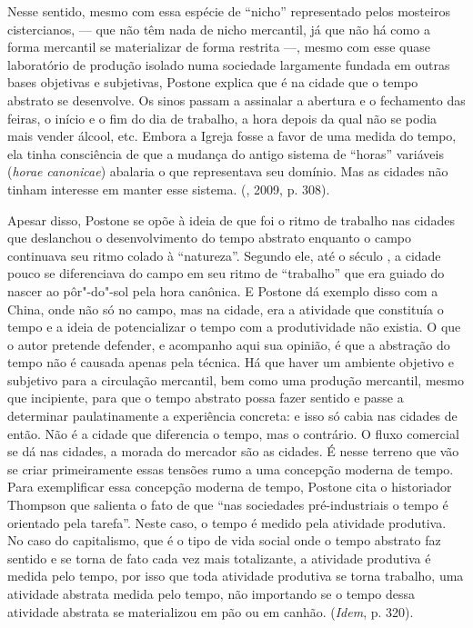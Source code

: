 Nesse sentido, mesmo com essa espécie de ``nicho'' representado pelos
mosteiros cistercianos, --- que não têm nada de nicho mercantil, já que não há
como a forma mercantil se materializar de forma restrita ---, mesmo com esse quase
laboratório de produção isolado numa sociedade largamente fundada em
outras bases objetivas e subjetivas, Postone explica que é na cidade que
o tempo abstrato se desenvolve. Os sinos passam a assinalar a abertura e
o fechamento das feiras, o início e o fim do dia de trabalho, a hora
depois da qual não se podia mais vender álcool, etc. Embora a Igreja
fosse a favor de uma medida do tempo, ela tinha consciência de que a
mudança do antigo sistema de ``horas'' variáveis (\emph{horae}
\emph{canonicae}) abalaria o que representava seu domínio. Mas as
cidades não tinham interesse em manter esse sistema. (, 2009, p.
308).

Apesar disso, Postone se opõe à ideia de que foi o ritmo de trabalho nas
cidades que deslanchou o desenvolvimento do tempo abstrato enquanto o
campo continuava seu ritmo colado à ``natureza''. Segundo ele, até o
século , a cidade pouco se diferenciava do campo em seu ritmo de
``trabalho'' que era guiado do nascer ao pôr"-do"-sol pela hora canônica.
E Postone dá exemplo disso com a China, onde não só no campo, mas na
cidade, era a atividade que constituía o tempo e a ideia de
potencializar o tempo com a produtividade não existia. O que o autor
pretende defender, e acompanho aqui sua opinião, é que a abstração do
tempo não é causada apenas pela técnica. Há que haver um ambiente
objetivo e subjetivo para a circulação mercantil, bem como uma produção
mercantil, mesmo que incipiente, para que o tempo abstrato possa fazer
sentido e passe a determinar paulatinamente a experiência concreta: e
isso só cabia nas cidades de então. Não é a cidade que diferencia o
tempo, mas o contrário. O fluxo comercial se dá nas cidades, a morada do
mercador são as cidades. É nesse terreno que vão se criar primeiramente
essas tensões rumo a uma concepção moderna de tempo. Para exemplificar
essa concepção moderna de tempo, Postone cita o historiador Thompson que
salienta o fato de que ``nas sociedades pré-industriais o tempo é
orientado pela tarefa''. Neste caso, o tempo é medido pela atividade
produtiva. No caso do capitalismo, que é o tipo de vida social onde o tempo
abstrato faz sentido e se torna de fato cada vez mais totalizante, a
atividade produtiva é medida pelo tempo, por isso que toda atividade
produtiva se torna trabalho, uma atividade abstrata medida pelo tempo,
não importando se o tempo dessa atividade abstrata se materializou em
pão ou em canhão. (\emph{Idem}, p. 320).

